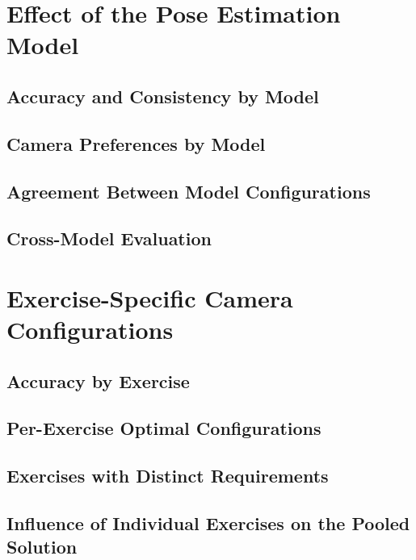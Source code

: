\section{Effect of the Pose Estimation Model}
\label{sec:modeleffect}

\subsection{Accuracy and Consistency by Model}

\subsection{Camera Preferences by Model}

\subsection{Agreement Between Model Configurations}

\subsection{Cross-Model Evaluation}

\section{Exercise-Specific Camera Configurations}
\label{sec:exerciseconfigs}

\subsection{Accuracy by Exercise}

\subsection{Per-Exercise Optimal Configurations}

\subsection{Exercises with Distinct Requirements}

\subsection{Influence of Individual Exercises on the Pooled Solution}

